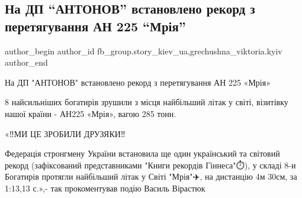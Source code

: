  
 
 
 
 

\subsection{На ДП \enquote{АНТОНОВ} встановлено рекорд з перетягування АН 225 \enquote{Мрія}}
\label{sec:26_08_2021.fb.fb_group.story_kiev_ua.1.na_dp__antonov__vsta}
 
\ifcmt
 author_begin
   author_id fb_group.story_kiev_ua,grechushna_viktoria.kyiv
 author_end
\fi

На ДП "АНТОНОВ" встановлено рекорд з перетягування АН 225 «Мрія»

8 найсильніших богатирів зрушили з місця найбільший літак у світі, візитівку
нашої країни - АН225 «Мрія», вагою 285 тонн.

«‼️МИ ЦЕ ЗРОБИЛИ ДРУЗЯКИ‼️

Федерація стронгмену України встановила ще один український та світовий рекорд
(зафіксований представниками "Книги рекордів Гіннеса"⏱️), у складі 8-и Богатирів
протягли найбільший літак у Світі "Мрія"✈️, на дистанцію 4м 30см, за 1:13,13
с.»,- так прокоментував подію Василь Вірастюк
